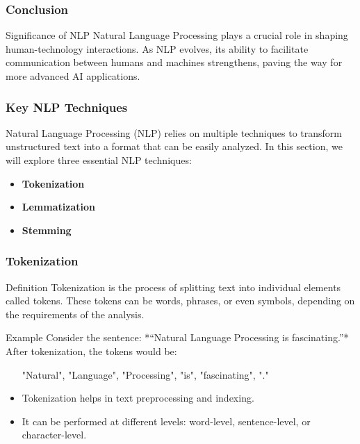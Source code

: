 \documentclass[aspectratio=169]{beamer}
\begin{document}
\begin{frame}[fragile]
    \frametitle{Conclusion}
    \begin{block}{Significance of NLP}
        Natural Language Processing plays a crucial role in shaping human-technology interactions. As NLP evolves, its ability to facilitate communication between humans and machines strengthens, paving the way for more advanced AI applications.
    \end{block}
\end{frame}

\begin{frame}[fragile]
    \frametitle{Key NLP Techniques}
    Natural Language Processing (NLP) relies on multiple techniques to transform unstructured text into a format that can be easily analyzed. In this section, we will explore three essential NLP techniques: 
    \begin{itemize}
        \item \textbf{Tokenization}
        \item \textbf{Lemmatization}
        \item \textbf{Stemming}
    \end{itemize}
\end{frame}

\begin{frame}[fragile]
    \frametitle{Tokenization}
    \begin{block}{Definition}
        Tokenization is the process of splitting text into individual elements called tokens. These tokens can be words, phrases, or even symbols, depending on the requirements of the analysis.
    \end{block}

    \begin{block}{Example}
        Consider the sentence: *“Natural Language Processing is fascinating.”*  
        After tokenization, the tokens would be:  
        \begin{itemize}
            \item ["Natural", "Language", "Processing", "is", "fascinating", "."]
        \end{itemize}
    \end{block}

    \begin{itemize}
        \item Tokenization helps in text preprocessing and indexing.
        \item It can be performed at different levels: word-level, sentence-level, or character-level.
    \end{itemize}
\end{frame}
\end{document}
